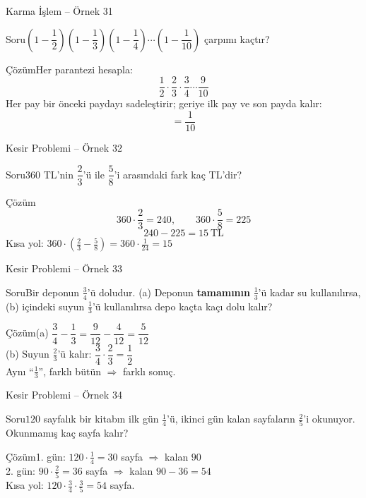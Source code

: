 \documentclass[aspectratio=169,11pt,handout]{beamer}
\newcommand{\soru}[3]{%
\begin{frame}{#1}
  \begin{block}{Soru}\large #2\end{block}
  \pause
  \begin{exampleblock}{Çözüm}\large #3\end{exampleblock}
\end{frame}}
\begin{document}
\soru{Karma İşlem -- Örnek 31}
{\(\left(1-\dfrac{1}{2}\right)\left(1-\dfrac{1}{3}\right)\left(1-\dfrac{1}{4}\right)\cdots\left(1-\dfrac{1}{10}\right)\) çarpımı kaçtır?}
{Her parantezi hesapla:
\[\frac{1}{2}\cdot\frac{2}{3}\cdot\frac{3}{4}\cdots\frac{9}{10}\]
Her pay bir önceki paydayı sadeleştirir; geriye ilk pay ve son payda kalır:
\[=\frac{1}{10}\]}

\soru{Kesir Problemi -- Örnek 32}
{\(360\) TL'nin \(\dfrac{2}{3}\)'ü ile \(\dfrac{5}{8}\)'i arasındaki fark kaç TL'dir?}
{\[360\cdot\frac{2}{3}=240,\qquad 360\cdot\frac{5}{8}=225\]
\[240-225=15\ \text{TL}\]
Kısa yol: \(360\cdot\left(\frac{2}{3}-\frac{5}{8}\right)=360\cdot\frac{1}{24}=15\)}

\soru{Kesir Problemi -- Örnek 33}
{Bir deponun \(\frac{3}{4}\)'ü doludur. (a) Deponun \textbf{tamamının} \(\frac{1}{3}\)'ü kadar su kullanılırsa, (b) içindeki suyun \(\frac{1}{3}\)'ü kullanılırsa depo kaçta kaçı dolu kalır?}
{(a) \(\dfrac{3}{4}-\dfrac{1}{3}=\dfrac{9}{12}-\dfrac{4}{12}=\dfrac{5}{12}\)\\[4pt]
(b) Suyun \(\frac{2}{3}\)'ü kalır: \quad \(\dfrac{3}{4}\cdot\dfrac{2}{3}=\dfrac{1}{2}\)\\[4pt]
Aynı ``\(\frac{1}{3}\)'', farklı bütün \(\Rightarrow\) farklı sonuç.}

\soru{Kesir Problemi -- Örnek 34}
{\(120\) sayfalık bir kitabın ilk gün \(\frac{1}{4}\)'ü, ikinci gün kalan sayfaların \(\frac{2}{5}\)'i okunuyor. Okunmamış kaç sayfa kalır?}
{1. gün: \(120\cdot\frac{1}{4}=30\) sayfa \(\Rightarrow\) kalan \(90\)\\[3pt]
2. gün: \(90\cdot\frac{2}{5}=36\) sayfa \(\Rightarrow\) kalan \(90-36=54\)\\[3pt]
Kısa yol: \(120\cdot\frac{3}{4}\cdot\frac{3}{5}=54\) sayfa.}
\end{document}

